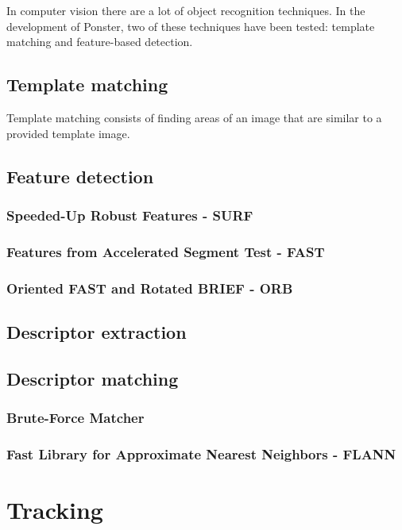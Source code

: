 In computer vision there are a lot of object recognition techniques. In the
development of Ponster, two of these techniques have been tested: template
matching and feature-based detection.

\subsection{Template matching}
Template matching consists of finding areas of an image that are similar to a
provided template image.

\subsection{Feature detection}
\subsubsection{Speeded-Up Robust Features - SURF}
\subsubsection{Features from Accelerated Segment Test - FAST}
\subsubsection{Oriented FAST and Rotated BRIEF - ORB}

\subsection{Descriptor extraction}
\subsection{Descriptor matching}
\subsubsection{Brute-Force Matcher}
\subsubsection{Fast Library for Approximate Nearest Neighbors - FLANN}

\section{Tracking}
